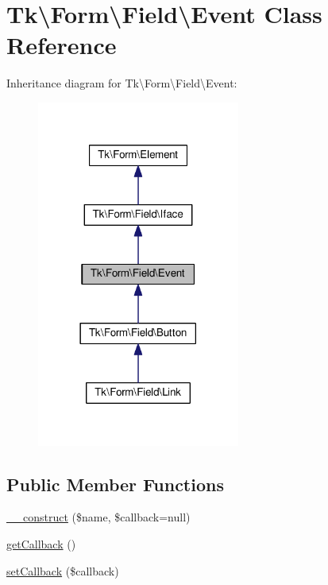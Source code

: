 \hypertarget{classTk_1_1Form_1_1Field_1_1Event}{\section{Tk\textbackslash{}Form\textbackslash{}Field\textbackslash{}Event Class Reference}
\label{classTk_1_1Form_1_1Field_1_1Event}
}


Inheritance diagram for Tk\textbackslash{}Form\textbackslash{}Field\textbackslash{}Event\+:\nopagebreak
\begin{figure}[H]
\begin{center}
\leavevmode
\includegraphics[width=189pt]{classTk_1_1Form_1_1Field_1_1Event__inherit__graph}
\end{center}
\end{figure}
\subsection*{Public Member Functions}
\begin{DoxyCompactItemize}
\item 
\hyperlink{classTk_1_1Form_1_1Field_1_1Event_a0574335765e57afd0cbb2d1ee99de99d}{\+\_\+\+\_\+construct} (\$name, \$callback=null)
\item 
\hyperlink{classTk_1_1Form_1_1Field_1_1Event_a0d582ec7ea4597127f314d765494d3d8}{get\+Callback} ()
\item 
\hyperlink{classTk_1_1Form_1_1Field_1_1Event_a15608a980278b92bb499c6ace2c8c7bd}{set\+Callback} (\$callback)
\end{DoxyCompactItemize}
